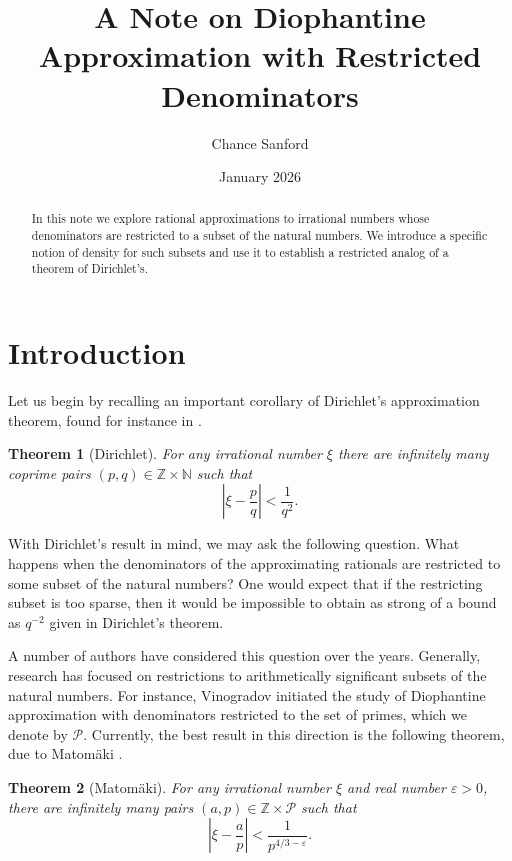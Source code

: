 \documentclass[reqno]{amsart}
\title{A Note on Diophantine Approximation with Restricted Denominators}
\author{Chance Sanford}
\date{January 2026}
\newtheorem{theorem}{Theorem}
\theoremstyle{definition}
\begin{document}
\begin{abstract}
    In this note we explore rational approximations to irrational numbers whose denominators are restricted to a subset of the natural numbers.  We introduce a specific notion of density for such subsets and use it to establish a restricted analog of a theorem of Dirichlet's.
\end{abstract}

\maketitle
\section{Introduction}
Let us begin by recalling an important corollary of Dirichlet's approximation theorem, found for instance in \cite{schmidt1980}.
\begin{theorem}[Dirichlet]\label{thm:dirichlet}
For any irrational number $\xi$ there are infinitely many coprime pairs $(p,q) \in \mathbb{Z} \times \mathbb{N}$ such that
\begin{equation*}
    \left\vert{\xi- \frac{p}{q}}\right\vert < \frac{1}{q^{2}}.
\end{equation*}
\end{theorem}

With Dirichlet's result in mind, we may ask the following question.   What happens when the denominators of the approximating rationals are restricted to some subset of the natural numbers? One would expect that if the restricting subset is too sparse, then it would be impossible to obtain as strong of a bound as $q^{-2}$ given in Dirichlet's theorem.

A number of authors have considered this question over the years.  Generally, research has focused on restrictions to arithmetically significant subsets of the natural numbers.  For instance, Vinogradov \cite{vinogradov1947} initiated the study of Diophantine approximation with denominators restricted to the set of primes, which we denote by $\mathcal{P}$. Currently, the best result in this direction is the following theorem, due to Matom{\"a}ki \cite{matomaki2009}.
\begin{theorem}[Matom{\"a}ki]\label{thm:matomaki}
For any irrational number $\xi$ and real number $\varepsilon > 0$, there are infinitely many pairs $(a,p) \in \mathbb{Z} \times \mathcal{P}$ such that
\begin{equation*}
    \left\vert{\xi- \frac{a}{p}}\right\vert < \frac{1}{p^{4/3-\varepsilon}}.
\end{equation*}
\end{theorem}
\end{document}
